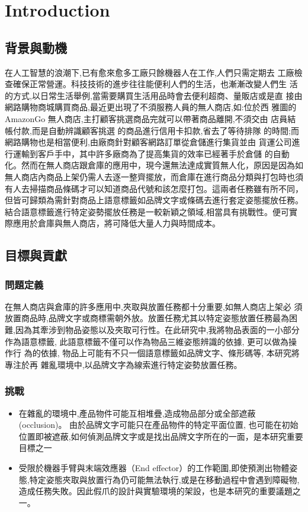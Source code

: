 \chapter{Introduction}
\label{chapter:intro}

\section{背景與動機}

在人工智慧的浪潮下,已有愈來愈多工廠只餘機器人在工作,人們只需定期去
工廠檢查確保正常營運。科技技術的進步往往能便利人們的生活，也漸漸改變人們生
活的方式,以日常生活舉例,當需要購買生活用品時會去便利超商、量販店或是直
接由網路購物商城購買商品,最近更出現了不須服務人員的無人商店,如:位於西
雅圖的 AmazonGo 無人商店,主打顧客挑選商品完就可以帶著商品離開,不須交由
店員結帳付款,而是自動辨識顧客挑選 的商品進行信用卡扣款,省去了等待排隊
的時間;而網路購物也是相當便利,由廠商針對顧客網路訂單從倉儲進行集貨並由
貨運公司進行運輸到客戶手中，其中許多廠商為了提高集貨的效率已經著手於倉儲
的自動化。然而在無人商店跟倉庫的應用中，現今還無法達成實質無人化，原因是因為如無人商店內商品上架仍需人去逐一整齊擺放，而倉庫在進行商品分類與打包時也須有人去掃描商品條碼才可以知道商品代號和該怎麼打包。這兩者任務雖有所不同，但皆可歸類為需針對商品上語意標籤如品牌文字或條碼去進行套定姿態擺放任務。結合語意標籤進行特定姿勢擺放任務是一較新穎之領域,相當具有挑戰性。便可實際應用於倉庫與無人商店，將可降低大量人力與時間成本。


\section{目標與貢獻}

\subsection{問題定義}
在無人商店與倉庫的許多應用中,夾取與放置任務都十分重要,如無人商店上架必
須放置商品時,品牌文字或商標需朝外放。放置任務尤其以特定姿態放置任務最為困
難,因為其牽涉到物品姿態以及夾取可行性。在此研究中,我將物品表面的一小部分
作為語意標籤, 此語意標籤不僅可以作為物品三維姿態辨識的依據, 更可以做為操作行
為的依據, 物品上可能有不只一個語意標籤如品牌文字、條形碼等, 本研究將專注於再
雜亂環境中,以品牌文字為線索進行特定姿勢放置任務。

\subsection{挑戰}
\begin{itemize}
\item 在雜亂的環境中,產品物件可能互相堆疊,造成物品部分或全部遮蔽 (occlusion)。
由於品牌文字可能只在產品物件的特定平面位置, 也可能在初始位置即被遮蔽,如何偵測品牌文字或是找出品牌文字所在的一面，是本研究重要目標之一
\item 受限於機器手臂與末端效應器（End effector）的工作範圍,即使預測出物體姿態,特定姿態夾取與放置行為仍可能無法執行,或是在移動過程中會遇到障礙物,造成任務失敗。因此假爪的設計與實驗環境的架設，也是本研究的重要議題之一。
\end{itemize}


